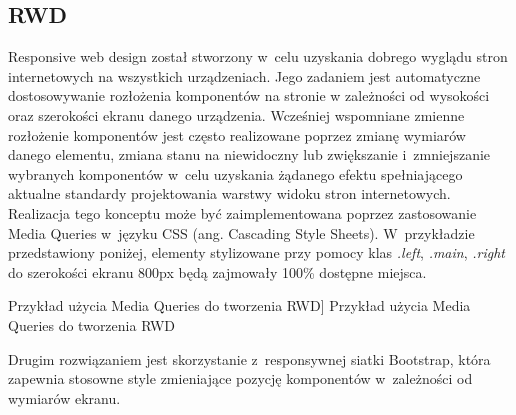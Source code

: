 \documentclass[../Kamil_Kowalewski_Main.tex]{subfiles}
\begin{document}
{{        \subsection{RWD}
        \label{chapter3:technologie:bootstrap:rwd} {
            Responsive web design został stworzony w~celu uzyskania dobrego wyglądu stron
            internetowych na wszystkich urządzeniach. Jego zadaniem jest automatyczne
            dostosowywanie rozłożenia komponentów na stronie w zależności od wysokości oraz
            szerokości ekranu danego urządzenia. Wcześniej wspomniane zmienne rozłożenie
            komponentów jest często realizowane poprzez zmianę wymiarów danego elementu, zmiana
            stanu na niewidoczny lub zwiększanie i~zmniejszanie wybranych komponentów
            w~celu uzyskania żądanego efektu spełniającego aktualne standardy
            projektowania warstwy widoku stron internetowych. Realizacja tego konceptu
            może być zaimplementowana poprzez zastosowanie Media Queries w~języku CSS
            (ang. Cascading Style Sheets). W~przykładzie przedstawiony poniżej, elementy stylizowane
            przy pomocy klas \textit{.left}, \textit{.main}, \textit{.right} do szerokości ekranu
            800px będą zajmowały 100\% dostępne miejsca.
            \begin{code}[H]
                
                \caption
                [Przykład użycia Media Queries do tworzenia RWD]
                {Przykład użycia Media Queries do tworzenia RWD}
                \label{chapter3:technologie:bootstrap:rwd:media_queries}
            \end{code}

            Drugim rozwiązaniem jest skorzystanie z~responsywnej siatki Bootstrap, która
            zapewnia stosowne style zmieniające pozycję komponentów w~zależności od
            wymiarów ekranu.
        }

}}
\end{document}
